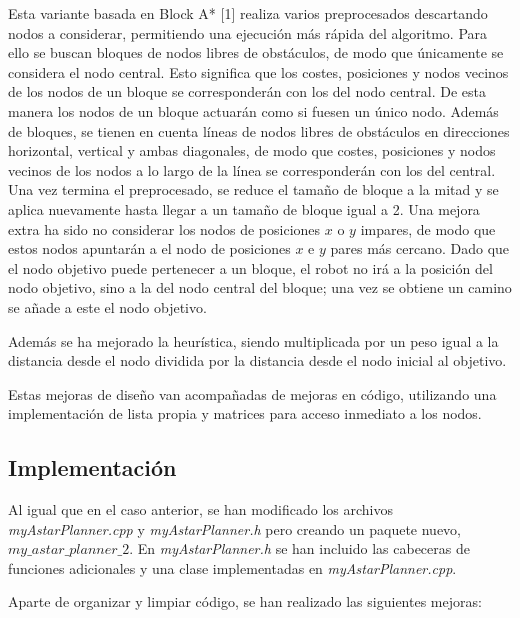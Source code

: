 \documentclass[11pt,spanish]{article} %
\begin{document}
Esta variante basada en Block A* [1] realiza varios preprocesados descartando nodos a considerar, permitiendo una ejecución más rápida del algoritmo. Para ello se buscan bloques de nodos libres de obstáculos, de modo que únicamente se considera el nodo central. Esto significa que los costes, posiciones y nodos vecinos de los nodos de un bloque se corresponderán con los del nodo central. De esta manera los nodos de un bloque actuarán como si fuesen un único nodo. Además de bloques, se tienen en cuenta líneas de nodos libres de obstáculos en direcciones horizontal, vertical y ambas diagonales, de modo que costes, posiciones y nodos vecinos de los nodos a lo largo de la línea se corresponderán con los del central. Una vez termina el preprocesado, se reduce el tamaño de bloque a la mitad y se aplica nuevamente hasta llegar a un tamaño de bloque igual a 2. Una mejora extra ha sido no considerar los nodos de posiciones $x$ o $y$ impares, de modo que estos nodos apuntarán a el nodo de posiciones $x$ e $y$ pares más cercano. Dado que el nodo objetivo puede pertenecer a un bloque, el robot no irá a la posición del nodo objetivo, sino a la del nodo central del bloque; una vez se obtiene un camino se añade a este el nodo objetivo.

Además se ha mejorado la heurística, siendo multiplicada por un peso igual a la distancia desde el nodo dividida por la distancia desde el nodo inicial al objetivo.

Estas mejoras de diseño van acompañadas de mejoras en código, utilizando una implementación de lista propia y matrices para acceso inmediato a los nodos.

\subsection{Implementación}

Al igual que en el caso anterior, se han modificado los archivos \textit{myAstarPlanner.cpp} y \textit{myAstarPlanner.h} pero creando un paquete nuevo, $my\_astar\_planner\_2$. En \textit{myAstarPlanner.h} se han incluido las cabeceras de funciones adicionales y una clase implementadas en \textit{myAstarPlanner.cpp}.

Aparte de organizar y limpiar código, se han realizado las siguientes mejoras:
\end{document}

